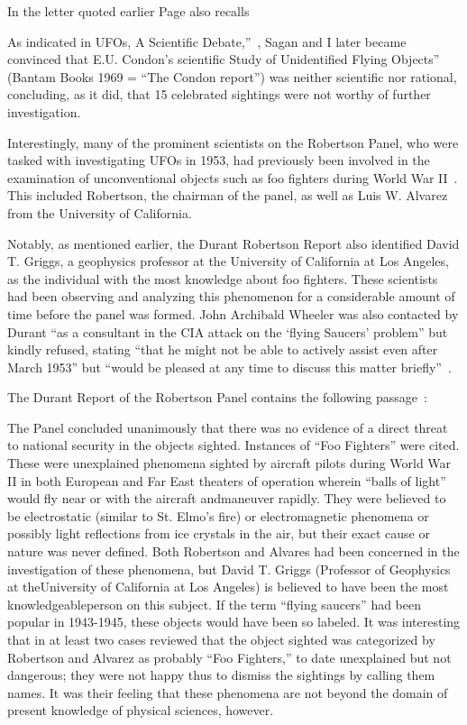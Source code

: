 In the letter quoted earlier Page also recalls~\cite{Page1992}
\begin{svgraybox}
As indicated in UFOs, A Scientific Debate,''~\cite{Sagan1974Jan}, Sagan and I later became convinced that E.U. Condon's scientific Study of Unidentified Flying Objects''~\cite{Condon-report}
(Bantam Books 1969 = ``The Condon report'')
was neither scientific nor rational, concluding, as it did, that 15 celebrated sightings were not worthy of further investigation.
\end{svgraybox}

Interestingly, many of the prominent scientists on the Robertson Panel,
who were tasked with investigating UFOs in 1953, had previously been involved in the examination of unconventional
objects such as foo fighters during World War II~\cite{Chester2007May,Rendall2021Aug}. This included Robertson,
the chairman of the panel,
as well as Luis W. Alvarez from the University of California.

Notably, as mentioned earlier, the Durant Robertson Report also identified David T. Griggs, a geophysics professor at the University of California at Los Angeles,
as the individual with the most knowledge about foo fighters. These scientists had been observing and
analyzing this phenomenon for a considerable amount of time before the panel was formed.
John Archibald Wheeler was also contacted by Durant ``as a consultant in the CIA attack on the `flying Saucers' problem'' but kindly refused,
stating ``that he might not be able to actively assist even after March 1953''
but ``would be pleased at any time to discuss this matter briefly''~\cite{WheelerFOIACIA0005515945}.

The Durant Report of the Robertson Panel contains the following passage~\cite{RobertsonPanelDurantReport}:
\begin{svgraybox}
The Panel concluded unanimously that there was no evidence of a direct threat to national security in the objects sighted.
Instances of ``Foo Fighters'' were cited.
These were unexplained phenomena sighted by aircraft pilots during World War II in both European and Far East theaters
of operation wherein ``balls of light'' would fly near or with the aircraft andmaneuver rapidly.
They were believed to be electrostatic (similar to St. Elmo's fire) or
electromagnetic phenomena or possibly light reflections from ice crystals in the air,
but their exact cause or nature was never defined.
Both Robertson and Alvares had been concerned in the investigation of these phenomena,
but David T. Griggs (Professor of Geophysics at theUniversity of California at Los Angeles)
is believed to have been the most knowledgeableperson on this subject.
If the term ``flying saucers'' had been popular in 1943-1945, these objects would
have been so labeled.
It was interesting that in at least two cases reviewed that the object sighted was categorized by Robertson and Alvarez as probably
``Foo Fighters,'' to date unexplained but not dangerous; they were not happy thus to dismiss the sightings by calling them names.
It was their feeling that these phenomena are not beyond the domain of present knowledge of physical sciences, however.
\end{svgraybox}

